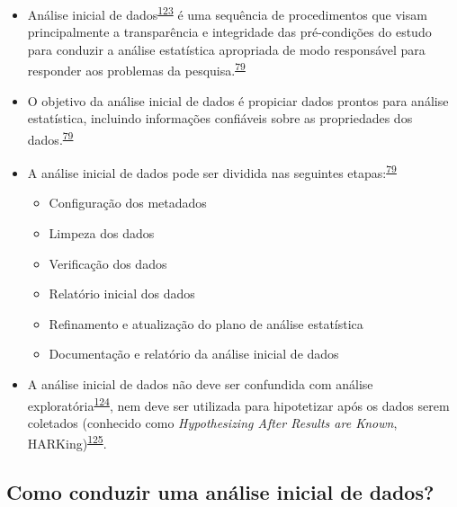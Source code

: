 \documentclass[
  a4paper,
]{book}
\begin{document}
\begin{itemize}
\item
  Análise inicial de dados\textsuperscript{\protect\hyperlink{ref-chatfield1986}{123}} é uma sequência de procedimentos que visam principalmente a transparência e integridade das pré-condições do estudo para conduzir a análise estatística apropriada de modo responsável para responder aos problemas da pesquisa.\textsuperscript{\protect\hyperlink{ref-Baillie2022}{79}}
\item
  O objetivo da análise inicial de dados é propiciar dados prontos para análise estatística, incluindo informações confiáveis sobre as propriedades dos dados.\textsuperscript{\protect\hyperlink{ref-Baillie2022}{79}}
\item
  A análise inicial de dados pode ser dividida nas seguintes etapas:\textsuperscript{\protect\hyperlink{ref-Baillie2022}{79}}

  \begin{itemize}
  \item
    Configuração dos metadados
  \item
    Limpeza dos dados
  \item
    Verificação dos dados
  \item
    Relatório inicial dos dados
  \item
    Refinamento e atualização do plano de análise estatística
  \item
    Documentação e relatório da análise inicial de dados
  \end{itemize}
\item
  A análise inicial de dados não deve ser confundida com análise exploratória\textsuperscript{\protect\hyperlink{ref-Ferketich1986}{124}}, nem deve ser utilizada para hipotetizar após os dados serem coletados (conhecido como \emph{Hypothesizing After Results are Known}, HARKing)\textsuperscript{\protect\hyperlink{ref-Kerr1998}{125}}.
\end{itemize}

\hypertarget{como-conduzir-uma-anuxe1lise-inicial-de-dados}{%
\subsection{Como conduzir uma análise inicial de dados?}\label{como-conduzir-uma-anuxe1lise-inicial-de-dados}}
\end{document}
